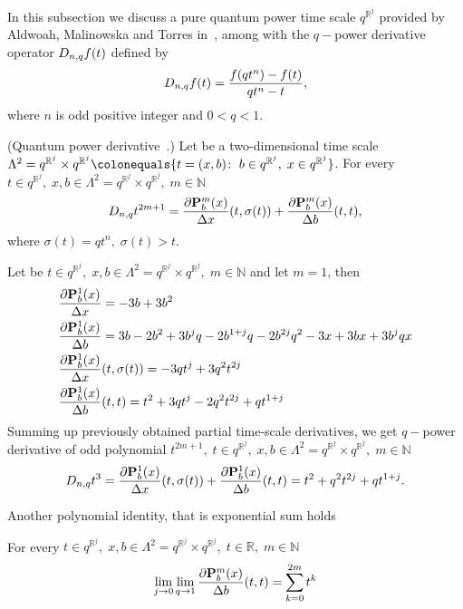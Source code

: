 In this subsection we discuss a pure quantum power time scale $q^{\mathbb{R}^j}$ provided by Aldwoah, Malinowska
and Torres in~\cite{aldwoah2011power}, among with the $q-$power derivative operator $D_{n,q} f(t)$ defined by
\[
    D_{n,q} f(t) = \frac{f(qt^n) - f(t)}{qt^n - t},
\]
where $n$ is odd positive integer and $0 < q < 1$.
\begin{cor}
    (Quantum power derivative~\cite{aldwoah2011power}.)
    Let be a two-dimensional time scale
    $\Lambda^2 = q^{\mathbb{R}^j} \times q^{\mathbb{R}^j}
    \colonequals \{t=(x,b) \colon \; b \in q^{\mathbb{R}^j}, \; x \in q^{\mathbb{R}^j} \}$.
    For every $t\in q^{\mathbb{R}^j}, \; x,b\in\Lambda^2 = q^{\mathbb{R}^j} \times q^{\mathbb{R}^j}, \; m\in\mathbb{N}$
    \[
        D_{n,q} t^{2m+1}
        = \frac{\partial {\mathbf{P}}\sp{m} \sb{b}(x)}{\Delta x}(t, \sigma(t))
        + \frac{\partial {\mathbf{P}}\sp{m} \sb{b}(x)}{\Delta b}(t, t),
    \]
    where $\sigma(t) = qt^n, \; \sigma(t) > t$.
\end{cor}
\begin{examp}
    Let be $t\in q^{\mathbb{R}^j}, \; x,b\in\Lambda^2 = q^{\mathbb{R}^j} \times q^{\mathbb{R}^j}, \; m\in\mathbb{N}$
    and let $m=1$, then
    \begin{align*}
        &\frac{\partial {\mathbf{P}}\sp{1} \sb{b}(x)}{\Delta x} = -3 b + 3 b^2 \\
        &\frac{\partial {\mathbf{P}}\sp{1} \sb{b}(x)}{\Delta b} = 3 b - 2 b^2 + 3 b^j q - 2 b^{1 + j} q - 2 b^{2 j} q^2 - 3 x + 3 b x + 3 b^j q x \\
        &\frac{\partial {\mathbf{P}}\sp{1} \sb{b}(x)}{\Delta x}(t, \sigma(t)) = -3 q t^j + 3 q^2 t^{2 j} \\
        &\frac{\partial {\mathbf{P}}\sp{1} \sb{b}(x)}{\Delta b}(t, t) = t^2 + 3 q t^j - 2 q^2 t^{2 j} + q t^{1 + j}
    \end{align*}
    Summing up previously obtained partial time-scale derivatives, we get $q-$power derivative of odd polynomial
    $t^{2m+1}, \; t\in q^{\mathbb{R}^j}, \; x,b\in\Lambda^2 = q^{\mathbb{R}^j} \times q^{\mathbb{R}^j}, \; m\in\mathbb{N}$
    \[
        D_{n,q} t^{3}
        = \frac{\partial {\mathbf{P}}\sp{1} \sb{b}(x)}{\Delta x}(t, \sigma(t)) + \frac{\partial {\mathbf{P}}\sp{1} \sb{b}(x)}{\Delta b}(t, t)
        = t^2 + q^2 t^{2 j} + q t^{1 + j}.
    \]
\end{examp}

Another polynomial identity, that is exponential sum holds
\begin{cor}
    For every $t\in q^{\mathbb{R}^j}, \; x,b\in\Lambda^2 = q^{\mathbb{R}^j} \times q^{\mathbb{R}^j}, \; t\in\mathbb{R}, \; m\in\mathbb{N}$
    \[
        \lim \limits_{j \to 0} \lim \limits_{q \to 1} \frac{\partial {\mathbf{P}}\sp{m} \sb{b}(x)}{\Delta b}(t,t) = \sum_{k=0}^{2m} t^k
    \]
\end{cor}

